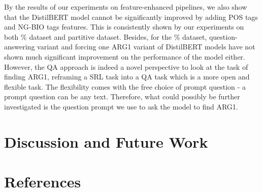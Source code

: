\documentclass[11pt]{article}
\begin{document}
By the results of our experiments on feature-enhanced pipelines, we also show that the DistilBERT model cannot be significantly improved by adding POS tags and NG-BIO tags features. This is consistently shown by our experiments on both \% dataset and partitive dataset. Besides, for the \% dataset, question-answering variant and forcing one ARG1 variant of DistilBERT models have not shown much significant improvement on the performance of the model either. However, the QA approach is indeed a novel perspective to look at the task of finding ARG1, reframing a SRL task into a QA task which is a more open and flexible task. The flexibility comes with the free choice of prompt question - a prompt question can be any text. Therefore, what could possibly be further investigated is the question prompt we use to ask the model to find ARG1.

\section{Discussion and Future Work}

\section*{References}



\end{document}
